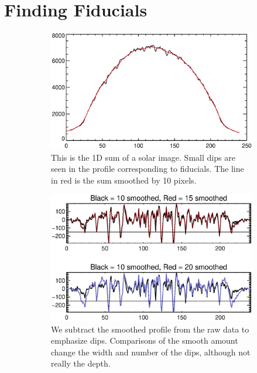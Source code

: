 \documentclass[10pt]{scrartcl}
\begin{document}

\section{Finding Fiducials} %
\label{sec:finding_fiducials}

\begin{figure}[!ht]
    \begin{subfigure}[b]{.5\linewidth}
        \centering
        \includegraphics[width=\linewidth]{../plots_tables_images/smooth_expl.eps}
        \caption{This is the 1D sum of a solar image. Small dips are seen in the profile corresponding to fiducials. The line in red is the sum smoothed by 10 pixels.}
        \label{doublelines}
    \end{subfigure}
    \begin{subfigure}[b]{.5\linewidth}
        \centering
        \includegraphics[width=\linewidth]{../plots_tables_images/smoothcomp.eps}
        \caption{We subtract the smoothed profile from the raw data to emphasize dips. Comparisons of the smooth amount change the width and number of the dips, although not really the depth.}
        \label{threshed}
    \end{subfigure}
    \caption{}
    \label{smoothed}
\end{figure}
\end{document}
